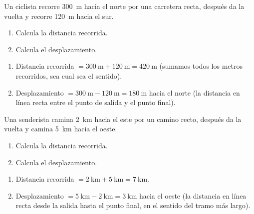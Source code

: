 \begin{exercise}
    Un ciclista recorre \qty{300}{\m} hacia el norte por una carretera recta, después da la vuelta y recorre \qty{120}{\m} hacia el sur.
    \begin{enumerate}[label=\letraminuscula]
        \item Calcula la distancia recorrida.
        \item Calcula el desplazamiento.
    \end{enumerate}
    \begin{solu}
        \begin{enumerate}[label=\alph*)]
            \item Distancia recorrida \(= \qty{300}{\m} + \qty{120}{\m} = \qty{420}{\m}\) (sumamos todos los metros recorridos, sea cual sea el sentido).
            \item Desplazamiento \(= \qty{300}{\m} - \qty{120}{\m} = \qty{180}{\m}\) hacia el norte (la distancia en línea recta entre el punto de salida y el punto final).
        \end{enumerate}
    \end{solu}
\end{exercise}

\begin{exercise}
    Una senderista camina \qty{2}{\km} hacia el este por un camino recto, después da la vuelta y camina \qty{5}{\km} hacia el oeste.
    \begin{enumerate}[label=\letraminuscula]
        \item Calcula la distancia recorrida.
        \item Calcula el desplazamiento.
    \end{enumerate}
    \begin{solu}
        \begin{enumerate}[label=\alph*)]
            \item Distancia recorrida \(= \qty{2}{\km} + \qty{5}{\km} = \qty{7}{\km}\).
            \item Desplazamiento \(= \qty{5}{\km} - \qty{2}{\km} = \qty{3}{\km}\) hacia el oeste (la distancia en línea recta desde la salida hasta el punto final, en el sentido del tramo más largo).
        \end{enumerate}
    \end{solu}
\end{exercise}


